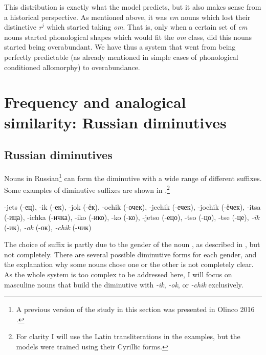 \largerpage
This distribution is exactly what the model predicts, but it also makes sense from a historical perspective. As mentioned above, it was \textit{em} nouns which lost their distinctive \textit{r}$^j$ which started taking \textit{om}. That is, only when a certain set of \textit{em} nouns started phonological shapes which would fit the \textit{om} class, did this nouns started being overabundant. We have thus a system that went from being perfectly predictable (as already mentioned in simple cases of phonological conditioned allomorphy) to overabundance.


\section{Frequency and analogical similarity: Russian diminutives}


\subsection{Russian diminutives}

Nouns in Russian\footnote{A previous version of the study in this section was presented in Olinco 2016 \autocite{GuzmanNaranjo.2016a}.} can form the diminutive with a wide range of different suffixes. Some examples of diminutive suffixes are shown in .\footnote{For clarity I will use the Latin transliterations in the examples, but the models were trained using their Cyrillic forms.}

\begin{exe}
    \ex \label{dims-russian} -jets (-ец), -ik (-ек),  -jok (-ёк), -ochik (-очек), -jechik (-ечек), -jochik (-ёчек), -itsa (-ица), -ichka (-ичка), -iko (-ико), -ko (-ко), -jetso (-ецо), -tso (-цо), -tse (-це),  \textit{-ik} (-ик),  \textit{-ok} (-ок),  \textit{-chik} (-чик)
\end{exe}

The choice of suffix is partly due to the gender of the noun \autocites{Kempe.2001, Kempe.2003}, as described in , but not completely. There are several possible diminutive forms for each gender, and the explanation why some nouns chose one or the other is not completely clear. As the whole system is too complex to be addressed here, I will focus on masculine nouns that build the diminutive with \textit{-ik}, \textit{-ok}, or \textit{-chik} exclusively.

